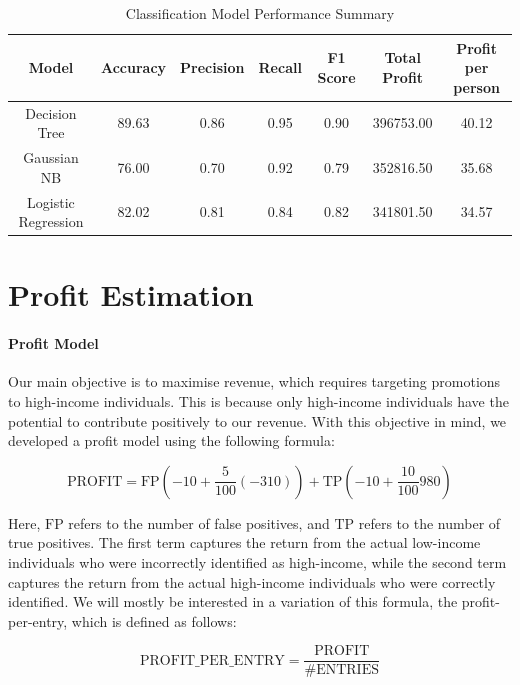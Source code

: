 \documentclass[twocolumn]{article}
\begin{document}
    \begin{table}[htbp]
        \centering
        \small
        \caption{Classification Model Performance Summary}
        \label{model_performance}
        \begin{tabular}{|c|c|c|c|c|c|c|}
        \hline
        \textbf{Model} & \textbf{Accuracy} & \textbf{Precision} & \textbf{Recall} & \textbf{F1 Score} & \textbf{Total Profit} & \textbf{Profit per person}\\ \hline
        Decision Tree        & 89.63 & 0.86 & 0.95 & 0.90 & 396753.00 & 40.12 \\ \hline
        Gaussian NB          & 76.00 & 0.70 & 0.92 & 0.79 & 352816.50 & 35.68 \\ \hline
        Logistic Regression  & 82.02 & 0.81 & 0.84 & 0.82 & 341801.50 & 34.57 \\ \hline
        \end{tabular}
    \end{table}

\section{Profit Estimation}

    \paragraph{Profit Model}
    Our main objective is to maximise revenue, which requires targeting promotions to high-income individuals.
    This is because only high-income individuals have the potential to contribute positively to our revenue.
    With this objective in mind, we developed a profit model using the following formula:

    \small
    \[
        \mathrm{PROFIT} = \mathrm{FP} (-10 + \frac{5}{100} (-310)) + \mathrm{TP} (-10 + \frac{10}{100} 980)
    \]
    \normalsize

    Here, $\mathrm{FP}$ refers to the number of false positives, and $\mathrm{TP}$ refers to the number of true positives. The first term captures the return from the actual low-income individuals who were incorrectly identified as high-income, while the second term captures the return from the actual high-income individuals who were correctly identified. We will mostly be interested in a variation of this formula, the profit-per-entry, which is defined as follows:

    \small
    \[
        \mathrm{PROFIT\_PER\_ENTRY} = \frac{\mathrm{PROFIT}}{\mathrm{\#ENTRIES}}
    \]
    \normalsize
\end{document}
